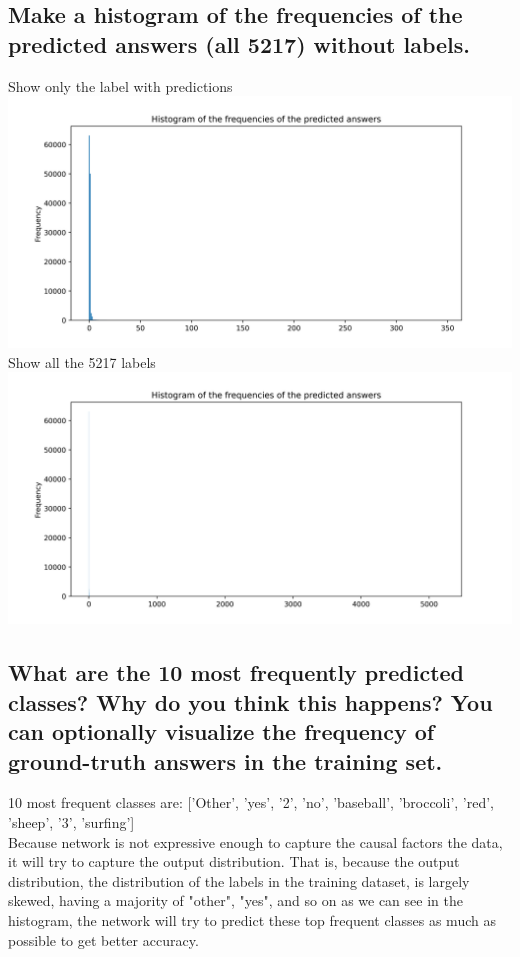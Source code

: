 \documentclass{article}
\begin{document}
\subsection{Make a histogram of the frequencies of the predicted answers (all 5217) without labels.}
Show only the label with predictions \\
\includegraphics[width=\textwidth]{q2.7_1.png}
Show all the 5217 labels \\
\includegraphics[width=\textwidth]{q2.7_2.png}

\subsection{What are the 10 most frequently predicted classes? Why do you think this happens? You can optionally visualize the frequency of ground-truth answers in the training set.}
10 most frequent classes are: ['Other', 'yes', '2', 'no', 'baseball', 'broccoli', 'red', 'sheep', '3', 'surfing'] \\
Because network is not expressive enough to capture the causal factors the data, it will try to capture the output distribution. That is, because the output distribution, the distribution of the labels in the training dataset, is largely skewed, having a majority of "other", "yes", and so on as we can see in the histogram, the network will try to predict these top frequent classes as much as possible to get better accuracy.
\end{document}
